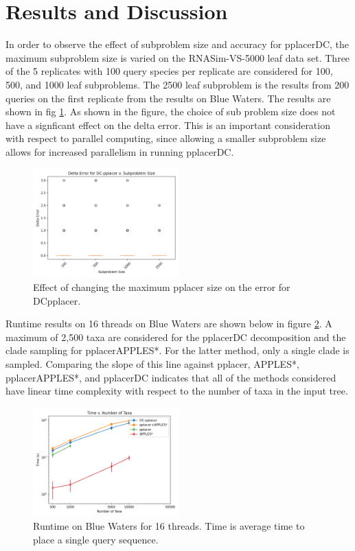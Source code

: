 \documentclass[10pt]{article}
\begin{document}
\section{Results and Discussion}

In order to observe the effect of subproblem size and accuracy for pplacerDC,
the maximum subproblem size is varied on the RNASim-VS-5000 leaf data set.
Three of the 5 replicates with 100 query species per replicate are
considered for 100, 500, and 1000 leaf subproblems. The 2500 leaf subproblem is the results from 200 queries on the first replicate from the results on Blue Waters.
The results are shown in fig \ref{fig:varying-size}.
As shown in the figure, the choice of sub problem size does not
have a signficant effect on the delta error.
This is an important consideration with respect to parallel computing,
since allowing a smaller subproblem size allows
for increased parallelism in running pplacerDC.

\begin{figure}
\centering
\includegraphics[width=0.5\textwidth]{Figs/varying-subproblem-size.png}
\caption{Effect of changing the maximum pplacer size on the error for DCpplacer.}
\label{fig:varying-size}
\end{figure}

Runtime results on 16 threads on Blue Waters are shown below in figure \ref{fig:timing-results}.
A maximum of 2,500 taxa are considered for the pplacerDC decomposition and the clade
sampling for pplacerAPPLES*.
For the latter method, only a single clade is sampled.
Comparing the slope of this line against pplacer, APPLES*, pplacerAPPLES*, and pplacerDC
indicates that all of the methods considered have linear time complexity with respect
to the number of taxa in the input tree.

\begin{figure}
\centering
\includegraphics[width=0.5\textwidth]{Figs/VS-timing-results-BW.png}
\caption{Runtime on Blue Waters for 16 threads. Time is average time to place a single query sequence.}
\label{fig:timing-results}
\end{figure}
\end{document}
